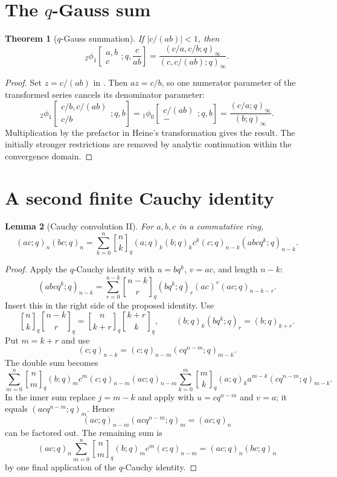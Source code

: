 \documentclass[11pt,oneside,openany]{book}
\newtheorem{theorem}{Theorem}[chapter]
\newtheorem{lemma}[theorem]{Lemma}
\theoremstyle{definition}
\theoremstyle{remark}
\newcommand{\qbinom}[2]{\genfrac{[}{]}{0pt}{}{#1}{#2}_{q}}
\newcommand{\abs}[1]{\lvert #1\rvert}
\begin{document}
\section{The \texorpdfstring{$q$}{q}-Gauss sum}

\begin{theorem}[$q$-Gauss summation]\label{thm:q-gauss}
If $\abs{c/(ab)}<1$, then
\[
 {}_2\phi_1\!\left[
 \begin{matrix}a,b\\c\end{matrix};q,\frac{c}{ab}\right]
 =\frac{(c/a,c/b;q)_\infty}{(c,c/(ab);q)_\infty}.
\]
\end{theorem}

\begin{proof}
Set $z=c/(ab)$ in .  Then $az=c/b$, so one numerator parameter of the transformed series cancels its denominator parameter:
\[
 {}_2\phi_1\!\left[\begin{matrix}c/b,c/(ab)\\c/b\end{matrix};q,b\right]
 ={}_1\phi_0\!\left[\begin{matrix}c/(ab)\\-\end{matrix};q,b\right]
 =\frac{(c/a;q)_\infty}{(b;q)_\infty}.
\]
Multiplication by the prefactor in Heine's transformation gives the result.  The initially stronger restrictions are removed by analytic continuation within the convergence domain.
\end{proof}

\section{A second finite Cauchy identity}

\begin{lemma}[Cauchy convolution II]\label{lem:cauchy-II}
For $a,b,c$ in a commutative ring,
\[
 (ac;q)_n(bc;q)_n
 =\sum_{k=0}^{n}\qbinom nk
 (a;q)_k(b;q)_k c^k(c;q)_{n-k}(abcq^k;q)_{n-k}.
\]
\end{lemma}

\begin{proof}
Apply the $q$-Cauchy identity  with $u=bq^k$, $v=ac$, and length $n-k$:
\[
 (abcq^k;q)_{n-k}
 =\sum_{r=0}^{n-k}\qbinom{n-k}{r}
 (bq^k;q)_r(ac)^r(ac;q)_{n-k-r}.
\]
Insert this in the right side of the proposed identity.  Use
\[
 \qbinom nk\qbinom{n-k}{r}
 =\qbinom n{k+r}\qbinom{k+r}k,
 \qquad
 (b;q)_k(bq^k;q)_r=(b;q)_{k+r}.
\]
Put $m=k+r$ and use
\[
 (c;q)_{n-k}=(c;q)_{n-m}(cq^{n-m};q)_{m-k}.
\]
The double sum becomes
\[
 \sum_{m=0}^{n}\qbinom nm(b;q)_m c^m(c;q)_{n-m}(ac;q)_{n-m}
 \sum_{k=0}^{m}\qbinom mk(a;q)_k a^{m-k}
 (cq^{n-m};q)_{m-k}.
\]
In the inner sum replace $j=m-k$ and apply  with $u=cq^{n-m}$ and $v=a$; it equals $(acq^{n-m};q)_m$.  Hence
\[
 (ac;q)_{n-m}(acq^{n-m};q)_m=(ac;q)_n
\]
can be factored out.  The remaining sum is
\[
 (ac;q)_n\sum_{m=0}^{n}\qbinom nm(b;q)_m c^m(c;q)_{n-m}
 =(ac;q)_n(bc;q)_n
\]
by one final application of the $q$-Cauchy identity.
\end{proof}
\end{document}

